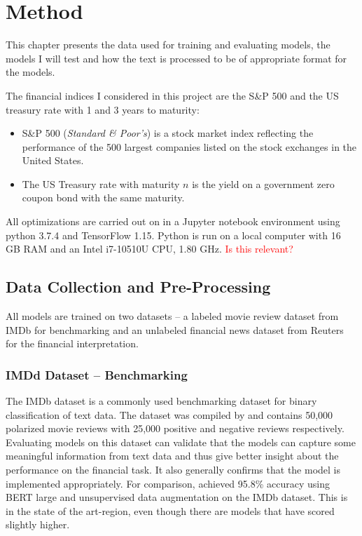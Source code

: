 \chapter{Method}

This chapter presents the data used for training and evaluating models, the models I will test and how the text is processed to be of appropriate format for the models. 

The financial indices I considered in this project are the S\&P 500 and the US treasury rate with 1 and 3 years to maturity:
\begin{itemize}
    \item S\&P 500 (\textit{Standard \& Poor's}) is a stock market index reflecting the performance of the 500 largest companies listed on the stock exchanges in the United States.
    \item The US Treasury rate with maturity $n$ is the yield on a government zero coupon bond with the same maturity. 
\end{itemize}

All optimizations are carried out on in a Jupyter notebook environment using python 3.7.4 and TensorFlow 1.15. Python is run on a local computer with 16 GB RAM and an Intel i7-10510U CPU, 1.80 GHz. 
\textcolor{red}{Is this relevant? }
\section{Data Collection and Pre-Processing}

All models are trained on two datasets -- a labeled movie review dataset from IMDb for benchmarking and an unlabeled financial news dataset from Reuters for the financial interpretation. 

\subsection{IMDd Dataset -- Benchmarking}
The IMDb dataset is a commonly used benchmarking dataset for binary classification of text data. The dataset was compiled by \citet{maas-EtAl:2011:ACL-HLT2011} and contains 50,000 polarized movie reviews with 25,000 positive and negative reviews respectively. Evaluating models on this dataset can validate that the models can capture some meaningful information from text data and thus give better insight about the performance on the financial task. It also  generally confirms that the model is implemented appropriately. For comparison, \citeauthor{xie2019unsupervised} achieved 95.8\% accuracy using BERT large and unsupervised data augmentation on the IMDb dataset. This is in the state of the art-region, even though there are models that have scored slightly higher. 

